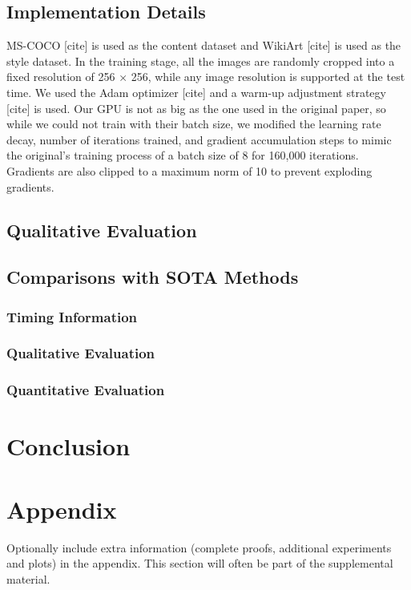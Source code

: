 \documentclass{article}
\begin{document}
\subsection{Implementation Details}

MS-COCO [cite] is used as the content dataset and WikiArt [cite] is used as the style dataset. In the training stage,
all the images are randomly cropped into a fixed resolution of 256 × 256, while any image resolution is supported at the test time. We used the Adam optimizer [cite] and a warm-up adjustment strategy [cite] is used. Our GPU is not as big as the one used in the original paper, so while we could not train with their batch size, we modified the learning rate decay, number of iterations trained, and gradient accumulation steps to mimic the original's training process of a batch size of 8 for 160,000 iterations. Gradients are also clipped to a maximum norm of 10 to prevent exploding gradients.

\subsection{Qualitative Evaluation}



\subsection{Comparisons with SOTA Methods}

\subsubsection{Timing Information}

\subsubsection{Qualitative Evaluation}

\subsubsection{Quantitative Evaluation}


\section{Conclusion}

\medskip

\nocite{*}



\appendix

\section{Appendix}

Optionally include extra information (complete proofs, additional experiments and plots) in the appendix.
This section will often be part of the supplemental material.
\end{document}
